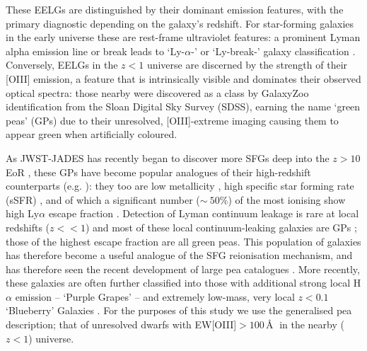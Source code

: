 \documentclass[fleqn,usenatbib]{mnras}
\begin{document}
These EELGs are distinguished by their dominant emission features, with the primary diagnostic depending on the galaxy's redshift. For star-forming galaxies in the early universe these are rest-frame ultraviolet features: a prominent Lyman alpha emission line or break leads to ‘Ly-$\alpha$-’ or ‘Ly-break-’ galaxy classification \citep{Tacchella_2023_2}. Conversely, EELGs in the $z < 1$ universe are discerned by the strength of their [OIII] emission, a feature that is intrinsically visible and dominates their observed optical spectra: those nearby were discovered as a class by GalaxyZoo \citep{cardamone} identification from the Sloan Digital Sky Survey (SDSS), earning the name ‘green peas’ (GPs) due to their unresolved, [OIII]-extreme imaging causing them to appear green when artificially coloured. 

As JWST-JADES has recently began to discover more SFGs deep into the $z>10$ EoR \citep{hainline_2023}, these GPs have become popular analogues of their high-redshift counterparts (e.g. \cite{brunker_2020, izotov_2018, Rhoads}): they too are low metallicity \citep{jiang}, high specific star forming rate (sSFR) \citep{brunker_2020, liu2022}, and of which a significant number ($\sim~50\%$) of the most ionising show high Ly$\alpha$ escape fraction \citep{jaskotoey,yang_2017}. Detection of Lyman continuum leakage is rare at local redshifts ($z<<1$) and most of these local continuum-leaking galaxies are GPs \citep{yang_2016, izotov_2016}; those of the highest escape fraction are all green peas. This population of galaxies has therefore become a useful analogue of the SFG reionisation mechanism, and has therefore seen the recent development of large pea catalogues \citep{samonski2025}. More recently, these galaxies are often further classified into those with additional strong local H$\alpha$ emission \citep{izotov2011} – ‘Purple Grapes’ – and extremely low-mass, very local $z<0.1$ ‘Blueberry’ Galaxies \citep{yang2017,liu2022}. For the purposes of this study we use the generalised pea description; that of unresolved dwarfs with EW[OIII]$>100\,$\AA$\;$ in the nearby ($z<1$) universe.
\end{document}
